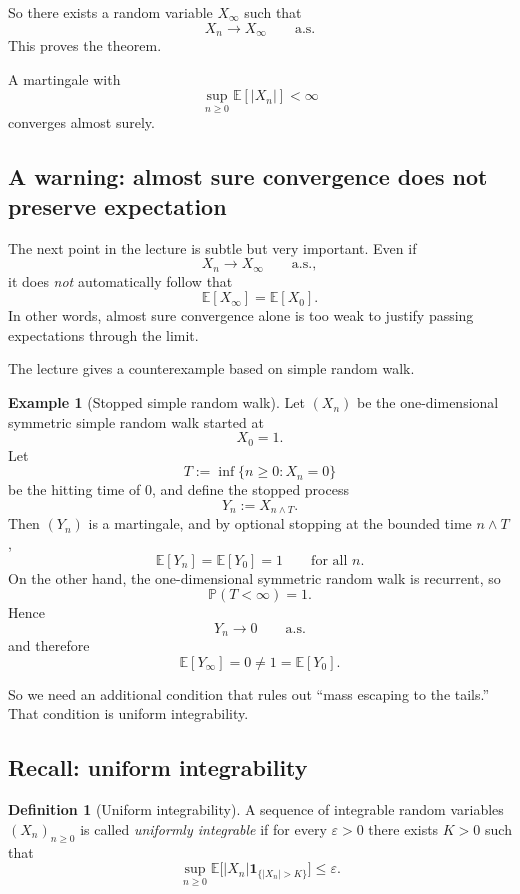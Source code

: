 \documentclass[11pt]{article}
\theoremstyle{definition}
\newtheorem{definition}[theorem]{Definition}
\newtheorem{example}[theorem]{Example}
\begin{document}
So there exists a random variable \(X_\infty\) such that
\[
X_n \to X_\infty
\qquad \text{a.s.}
\]
This proves the theorem.

\begin{keyformula}
A martingale with
\[
\sup_{n\ge 0}\mathbb E[|X_n|] < \infty
\]
converges almost surely.
\end{keyformula}

\subsection{A warning: almost sure convergence does not preserve expectation}

The next point in the lecture is subtle but very important. Even if
\[
X_n \to X_\infty \qquad \text{a.s.},
\]
it does \emph{not} automatically follow that
\[
\mathbb E[X_\infty] = \mathbb E[X_0].
\]
In other words, almost sure convergence alone is too weak to justify passing expectations through the limit.

The lecture gives a counterexample based on simple random walk.

\begin{example}[Stopped simple random walk]
Let \((X_n)\) be the one-dimensional symmetric simple random walk started at
\[
X_0=1.
\]
Let
\[
T := \inf\{n\ge 0 : X_n = 0\}
\]
be the hitting time of \(0\), and define the stopped process
\[
Y_n := X_{n\wedge T}.
\]
Then \((Y_n)\) is a martingale, and by optional stopping at the bounded time \(n\wedge T\),
\[
\mathbb E[Y_n] = \mathbb E[Y_0] = 1
\qquad \text{for all } n.
\]
On the other hand, the one-dimensional symmetric random walk is recurrent, so
\[
\mathbb P(T<\infty)=1.
\]
Hence
\[
Y_n \to 0 \qquad \text{a.s.}
\]
and therefore
\[
\mathbb E[Y_\infty]=0 \neq 1 = \mathbb E[Y_0].
\]
\end{example}

So we need an additional condition that rules out ``mass escaping to the tails.'' That condition is uniform integrability.

\subsection{Recall: uniform integrability}

\begin{definition}[Uniform integrability]
A sequence of integrable random variables \((X_n)_{n\ge 0}\) is called \emph{uniformly integrable} if for every \(\varepsilon>0\) there exists \(K>0\) such that
\[
\sup_{n\ge 0}
\mathbb E\bigl[|X_n|\mathbf 1_{\{|X_n|>K\}}\bigr]
\le \varepsilon.
\]
\end{definition}
\end{document}
